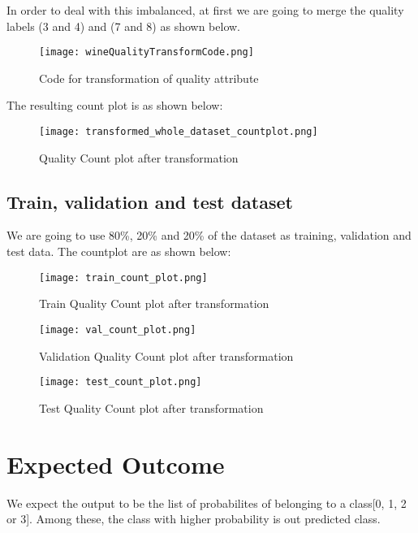 In order to deal with this imbalanced, at first we are going to merge the quality labels (3 and 4) and (7 and 8) as shown below.


\begin{figure}[H]
    \centering
    \texttt{[image: wineQualityTransformCode.png]}
    \caption{Code for transformation of quality attribute}
    \label{fig:Code for transformation of quality attribute}
\end{figure}

The resulting count plot is as shown below:
\begin{figure}[H]
    \centering
    \texttt{[image: transformed\_whole\_dataset\_countplot.png]}
    \caption{Quality Count plot after transformation}
    \label{fig:Quality Count plot after transformation}
\end{figure}

\subsection{Train, validation and test dataset}
We are going to use 80\%, 20\% and 20\% of the dataset as training, validation and test data. The countplot are as shown below:

\begin{figure}[H]
    \centering
    \texttt{[image: train\_count\_plot.png]}
    \caption{Train Quality Count plot after transformation}
    \label{fig:Train Quality Count plot after transformation}
\end{figure}

\begin{figure}[H]
    \centering
    \texttt{[image: val\_count\_plot.png]}
    \caption{Validation Quality Count plot after transformation}
    \label{fig:Validation Quality Count plot after transformation}
\end{figure}

\begin{figure}[H]
    \centering
    \texttt{[image: test\_count\_plot.png]}
    \caption{Test Quality Count plot after transformation}
    \label{fig:Test Quality Count plot after transformation}
\end{figure}

\section{Expected Outcome}
We expect the output to be the list of probabilites of belonging to a class[0, 1, 2 or 3]. Among these, the class with higher probability is out predicted class.


